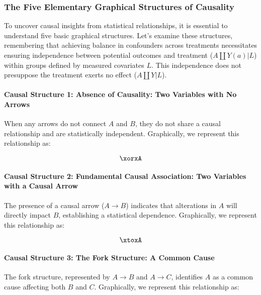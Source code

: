 \documentclass[
  singlecolumn]{article}
\let\oldparagraph\paragraph
\renewcommand{\paragraph}[1]{\oldparagraph{#1}\mbox{}}
\begin{document}
\subsubsection{The Five Elementary Graphical Structures of
Causality}\label{sec-five-elementary}

To uncover causal insights from statistical relationships, it is
essential to understand five basic graphical structures. Let's examine
these structures, remembering that achieving balance in confounders
across treatments necessitates ensuring independence between potential
outcomes and treatment (\(A\coprod Y(a)|L\)) within groups defined by
measured covariates \(L\). This independence does not presuppose the
treatment exerts no effect (\(A\coprod Y |L\)).

\paragraph{Causal Structure 1: Absence of Causality: Two Variables with
No
Arrows}\label{causal-structure-1-absence-of-causality-two-variables-with-no-arrows}

When any arrows do not connect \(A\) and \(B\), they do not share a
causal relationship and are statistically independent. Graphically, we
represent this relationship as:

\[\xorxA\]

\paragraph{Causal Structure 2: Fundamental Causal Association: Two
Variables with a Causal
Arrow}\label{causal-structure-2-fundamental-causal-association-two-variables-with-a-causal-arrow}

The presence of a causal arrow (\(A \to B\)) indicates that alterations
in \(A\) will directly impact \(B\), establishing a statistical
dependence. Graphically, we represent this relationship as:

\[\xtoxA\]

\paragraph{Causal Structure 3: The Fork Structure: A Common
Cause}\label{causal-structure-3-the-fork-structure-a-common-cause}

The fork structure, represented by \(A \rightarrow B\) and
\(A \rightarrow C\), identifies \(A\) as a common cause affecting both
\(B\) and \(C\). Graphically, we represent this relationship as:
\end{document}
